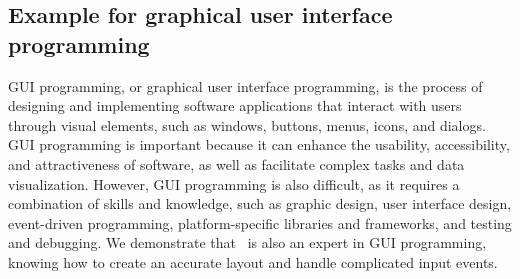\subsection{Example for graphical user interface programming}
 
GUI programming, or graphical user interface programming, is the process of designing and implementing software applications that interact with users through visual elements, such as windows, buttons, menus, icons, and dialogs. GUI programming is important because it can enhance the usability, accessibility, and attractiveness of software, as well as facilitate complex tasks and data visualization. However, GUI programming is also difficult, as it requires a combination of skills and knowledge, such as graphic design, user interface design, event-driven programming, platform-specific libraries and frameworks, and testing and debugging. We demonstrate that \DV\ is also an expert in GUI programming, knowing how to create an accurate layout and handle complicated input events.




